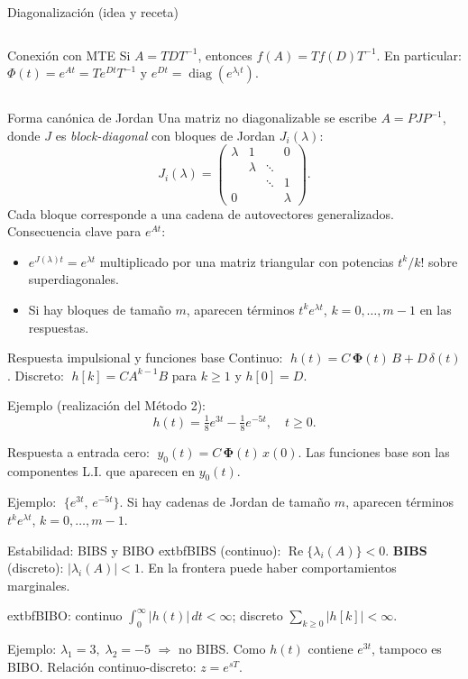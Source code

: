 \documentclass[
    10pt,
    aspectratio=169,
    xcolor={dvipsnames},
    spanish,
    ]{beamer}
\begin{document}
\begin{frame}{Diagonalización (idea y receta)}
\begin{columns}
\begin{column}{0.46\textwidth}
    \begin{block}{Conexión con MTE}
    Si $A=TDT^{-1}$, entonces $f(A)=Tf(D)T^{-1}$. En particular: $\Phi(t)=e^{At}=Te^{Dt}T^{-1}$ y $e^{Dt}=\operatorname{diag}(e^{\lambda_i t})$.
    \end{block}
  \end{column}
\end{columns}
\end{frame}


\begin{frame}{Forma canónica de Jordan}
\footnotesize
Una matriz no diagonalizable se escribe $A=PJP^{-1}$, donde $J$ es \emph{block-diagonal} con bloques de Jordan $J_i(\lambda)$:
\[
J_i(\lambda)=\begin{pmatrix}
\lambda & 1 &  & 0\\
 & \lambda & \ddots & \\
 &  & \ddots & 1\\
0 &  &  & \lambda
\end{pmatrix}.
\]
Cada bloque corresponde a una cadena de autovectores generalizados. Consecuencia clave para $e^{At}$:
\begin{itemize}\itemsep2pt
  \item $e^{J(\lambda)t}=e^{\lambda t}$ multiplicado por una matriz triangular con potencias $t^k/k!$ sobre superdiagonales.
  \item Si hay bloques de tamaño $m$, aparecen términos $t^k e^{\lambda t}$, $k=0,\dots,m-1$ en las respuestas.
\end{itemize}
\end{frame}

\begin{frame}{Respuesta impulsional y funciones base}
\footnotesize
Continuo: $\;h(t)=C\,\boldsymbol{\Phi}(t)\,B + D\,\delta(t)$.\; Discreto: $\;h[k]=C A^{k-1}B$ para $k\ge1$ y $h[0]=D$.

\medskip
Ejemplo (realización del Método 2):
\[h(t)=\tfrac{1}{8}e^{3t}-\tfrac{1}{8}e^{-5t},\quad t\ge 0.\]

Respuesta a entrada cero: $\;y_0(t)=C\,\boldsymbol{\Phi}(t)\,x(0)$.
Las funciones base son las componentes L.I. que aparecen en $y_0(t)$.

\medskip
Ejemplo: $\;\{e^{3t},\,e^{-5t}\}$. Si hay cadenas de Jordan de tamaño $m$, aparecen términos $t^k e^{\lambda t}$, $k=0,\dots,m-1$.
\end{frame}

\begin{frame}{Estabilidad: BIBS y BIBO}
\footnotesize
	extbf{BIBS} (continuo): $\operatorname{Re}\{\lambda_i(A)\}<0$. \;\textbf{BIBS} (discreto): $|\lambda_i(A)|<1$. En la frontera puede haber comportamientos marginales.

\medskip
	extbf{BIBO}: continuo $\int_0^{\infty}|h(t)|\,dt<\infty$; discreto $\sum_{k\ge 0}|h[k]|<\infty$.

\medskip
Ejemplo: $\lambda_1=3,\;\lambda_2=-5$ \;$\Rightarrow$\; no BIBS. Como $h(t)$ contiene $e^{3t}$, tampoco es BIBO. Relación continuo-discreto: $z=e^{sT}$.
\end{frame}
\end{document}
